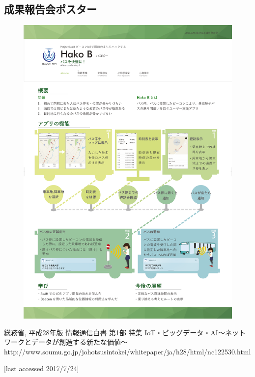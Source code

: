 \documentclass[openany,11pt,papersize]{jsbook}
\begin{document}
\begin{appendix}
\chapter{成果報告会ポスター}
\begin{figure}[htbp]
  \begin{center}
    \includegraphics[clip,width=14cm]{img/final_poster.png}
    \label{fig:poster}
  \end{center}
\end{figure}
  
  \end{appendix}
  
  
  
  \begin{thebibliography}{9}
     総務省, 平成28年版 情報通信白書 第1部 特集 IoT・ビッグデータ・AI～ネットワークとデータが創造する新たな価値～
    http://www.soumu.go.jp/johotsusintokei/whitepaper/ja/h28/html/nc122530.html
  
    [last accessed 2017/7/24]
  \end{thebibliography}
  
  
\end{document}
